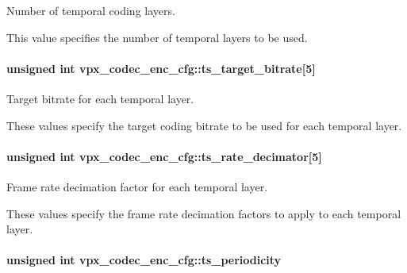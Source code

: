 Number of temporal coding layers. 

This value specifies the number of temporal layers to be used. 
\paragraph[{\texorpdfstring{ts\+\_\+target\+\_\+bitrate}{ts_target_bitrate}}]{\setlength{\rightskip}{0pt plus 5cm}unsigned int vpx\+\_\+codec\+\_\+enc\+\_\+cfg\+::ts\+\_\+target\+\_\+bitrate\mbox{[}5\mbox{]}}\hypertarget{structvpx__codec__enc__cfg_aba7ceb7a90500a8f76aff89575737f3a}{}\label{structvpx__codec__enc__cfg_aba7ceb7a90500a8f76aff89575737f3a}


Target bitrate for each temporal layer. 

These values specify the target coding bitrate to be used for each temporal layer. 
\paragraph[{\texorpdfstring{ts\+\_\+rate\+\_\+decimator}{ts_rate_decimator}}]{\setlength{\rightskip}{0pt plus 5cm}unsigned int vpx\+\_\+codec\+\_\+enc\+\_\+cfg\+::ts\+\_\+rate\+\_\+decimator\mbox{[}5\mbox{]}}\hypertarget{structvpx__codec__enc__cfg_ad40c30846ef8ef1d8684f10a491ec535}{}\label{structvpx__codec__enc__cfg_ad40c30846ef8ef1d8684f10a491ec535}


Frame rate decimation factor for each temporal layer. 

These values specify the frame rate decimation factors to apply to each temporal layer. 
\paragraph[{\texorpdfstring{ts\+\_\+periodicity}{ts_periodicity}}]{\setlength{\rightskip}{0pt plus 5cm}unsigned int vpx\+\_\+codec\+\_\+enc\+\_\+cfg\+::ts\+\_\+periodicity}\hypertarget{structvpx__codec__enc__cfg_a4ec338780115dd270acf0dac24193474}{}\label{structvpx__codec__enc__cfg_a4ec338780115dd270acf0dac24193474}



